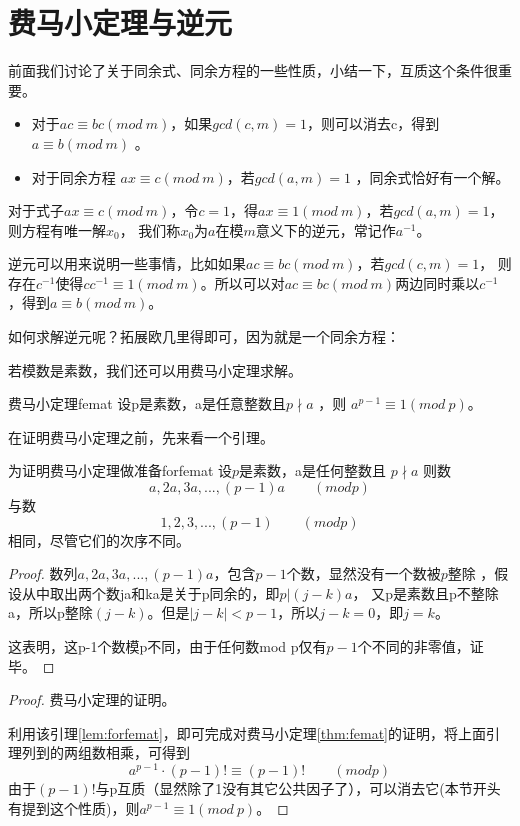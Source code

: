 \section{费马小定理与逆元}
前面我们讨论了关于同余式、同余方程的一些性质，小结一下，互质这个条件很重要。

\begin{itemize}
	\item 对于$ac\equiv bc(mod \ m)$，如果$gcd(c,m)=1$，则可以消去c，得到$a\equiv b(mod \ m)$ 。
	\item 对于同余方程 $ax\equiv c(mod\ m)$，若$gcd(a,m)=1$ ，同余式恰好有一个解。
\end{itemize}

{\heiti 对于式子$ax\equiv c(mod\ m)$，令$c=1$，得$ax\equiv 1(mod\ m)$，若$gcd(a,m)=1$，则方程有唯一解$x_0$，
我们称$x_0$为$a$在模$m$意义下的逆元，常记作$a^{-1}$。}

逆元可以用来说明一些事情，比如如果$ac\equiv bc(mod\ m)$，若$gcd(c,m)=1$，
则存在$c^{-1}$使得$cc^{-1}\equiv 1 (mod\ m)$。所以可以对$ac\equiv bc(mod\ m)$两边同时乘以$c^{-1}$，得到$a\equiv b(mod\ m)$。

如何求解逆元呢？拓展欧几里得即可，因为就是一个同余方程：


\vbox{}

若模数是素数，我们还可以用费马小定理求解。

\begin{theorem}{费马小定理}{femat}
	设p是素数，a是任意整数且$p\nmid a$ ，则 $a^{p-1}\equiv 1(mod\ p)$。 
\end{theorem}

在证明费马小定理之前，先来看一个引理。

\begin{lemma}{为证明费马小定理做准备}{forfemat}
	设$p$是素数，a是任何整数且 $p\nmid a$ 则数
	$$
	a,2a,3a,...,(p-1)a\qquad (modp)
	$$
	与数
	$$
	1,2,3,...,(p-1)\qquad (modp)
	$$
	相同，尽管它们的次序不同。
\end{lemma}

\begin{proof}
	数列$a,2a,3a,...,(p-1)a$，包含$p-1$个数，显然没有一个数被$p$整除 ，假设从中取出两个数ja和ka是关于p同余的，即$p|(j-k)a$，
	又p是素数且p不整除a，所以p整除$(j-k)$。但是$|j-k|<p-1 $，所以$j-k=0$，即$j=k$。
	
	这表明，这p-1个数模p不同，由于任何数mod p仅有$p-1$个不同的非零值，证毕。
\end{proof}

\begin{proof}
	费马小定理的证明。
	
	利用该引理\ref{lem:forfemat}，即可完成对费马小定理\ref{thm:femat}的证明，将上面引理列到的两组数相乘，可得到
	$$
	a^{p-1} \cdot (p-1)!\equiv (p-1)!   \qquad (modp)
	$$
	由于$(p-1)!$与p互质（显然除了1没有其它公共因子了），可以消去它(本节开头有提到这个性质)，则$a^{p-1}\equiv 1(mod\ p)$。
\end{proof}

